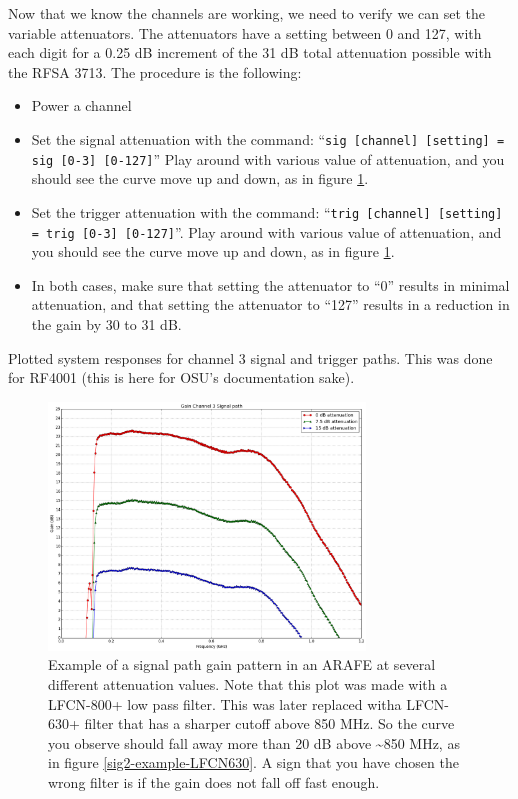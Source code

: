 \documentclass[letter,12pt]{article}
\begin{document}
Now that we know the channels are working, we need to verify we can set the variable attenuators. The attenuators have a setting between 0 and 127, with each digit for a 0.25 dB increment of the 31 dB total attenuation possible with the RFSA 3713. The procedure is the following:
\begin{itemize}
\item Power a channel
\item Set the signal attenuation with the command: ``\texttt{sig [channel] [setting] = sig [0-3] [0-127]}'' Play around with various value of attenuation, and you should see the curve move up and down, as in figure \ref{sig3-example}. 
\item Set the trigger attenuation with the command: ``\texttt{trig [channel] [setting] = trig [0-3] [0-127]}''. Play around with various value of attenuation, and you should see the curve move up and down, as in figure \ref{sig3-example}.
\item In both cases, make sure that setting the attenuator to ``0'' results in minimal attenuation, and that setting the attenuator to ``127'' results in a reduction in the gain by 30 to 31 dB.
\end{itemize}
Plotted system responses for channel 3 signal and trigger paths. This was done for RF4001 (this is here for OSU's documentation sake).

\begin{figure}
\begin{centering}
\includegraphics[width=0.75\textwidth]{photos/RF4001_SIG3.png}
\par\end{centering}
\caption{Example of a signal path gain pattern in an ARAFE at several different attenuation values. Note that this plot was made with a LFCN-800+ low pass filter. This was later replaced witha LFCN-630+ filter that has a sharper cutoff above 850 MHz. So the curve you observe should fall away more than 20 dB above \textasciitilde{}850 MHz, as in figure
\ref{sig2-example-LFCN630}. A sign that you have chosen the wrong filter is if the gain does not fall off fast enough.}
\label{sig3-example}
\end{figure}
\end{document}
